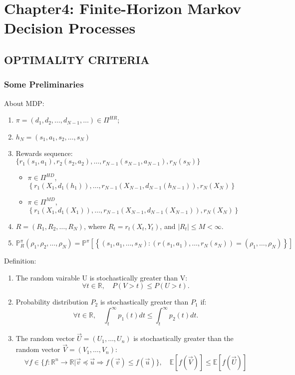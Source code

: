 
\section{Chapter4: Finite-Horizon Markov Decision Processes}%
\label{sec:chapter4}

\subsection{OPTIMALITY CRITERIA}%
\label{sub:optimality_criteria}

\subsubsection{Some Preliminaries}%
\label{subsub:some_preliminaries}

About MDP:\@
\begin{enumerate}
    \item $ \pi = (d_1, d_2, \ldots, d_{N-1}, \ldots) \in \Pi^{HR}$;
    \item $ h_N = (s_1, a_1, s_2, \ldots, s_N) $ 
    \item Rewards sequence: $ \{ r_1(s_1, a_1), r_2(s_2,a_2), \ldots, r_{N-1}(s_{N-1}, a_{N-1}), r_N(s_N) \} $ 
        \begin{itemize}
            \item $ \pi \in \Pi^{HD} $, $ \left\{ r_1(X_1, d_1(h_1)), \ldots, r_{N-1}(X_{N-1}, d_{N-1}(h_{N-1})), r_N(X_N) \right\} $ 
            \item $ \pi \in \Pi^{MD} $, $ \left\{ r_1(X_1, d_1(X_1)), \ldots, r_{N-1}(X_{N-1}, d_{N-1}(X_{N-1})), r_N(X_N) \right\} $ 
        \end{itemize}
    \item $ R = (R_1, R_2, \ldots, R_N) $, where $ R_t = r_t(X_t, Y_t) $, and $ |R_t| \le M < \infty $.
    \item $ \mathbb{P}^\pi_{R} (\rho_1, \rho_2, \ldots, \rho_N) = \mathbb{P}^\pi 
        \left[ \left\{ (s_1, a_1, \ldots, s_N):(r(s_1, a_1),\ldots, r_N(s_N)) = (\rho_1, \ldots, \rho_N) \right\} \right]$ 
\end{enumerate}

Definition:
\begin{enumerate}
    \item The random vairable U is stochastically greater than V:\@ 
        \[
            \forall t \in \mathbb{R},\quad P(V > t) \le P(U > t).
        \]
    \item Probability distribution $ P_2 $ is stochastically greater than $ P_1 $ if:
        \[
            \forall t \in \mathbb{R},\quad \int^\infty_t p_1(t) dt \le \int^\infty_t p_2(t)dt.
        \]
    \item The random vector $ \vec U = (U_1, \ldots, U_n) $ is stochastically greater than the random vector $ \vec V = (V_1, \ldots, V_n) $:
        \[
          \forall f \in \{ f: \mathbb{R}^n \rightarrow \mathbb{R} | \vec v \preceq \vec u \Rightarrow f(\vec v) \le f(\vec u) \},\quad
          \mathbb{E}[f(\vec V)] \le \mathbb{E}[f(\vec U)]
        \]
\end{enumerate}

